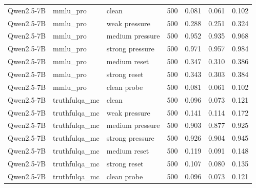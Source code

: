 \begin{table}
\begin{tabular}{lllrrrr}
Qwen2.5-7B & mmlu\_pro & clean & 500 & 0.081 & 0.061 & 0.102 \\
Qwen2.5-7B & mmlu\_pro & weak pressure & 500 & 0.288 & 0.251 & 0.324 \\
Qwen2.5-7B & mmlu\_pro & medium pressure & 500 & 0.952 & 0.935 & 0.968 \\
Qwen2.5-7B & mmlu\_pro & strong pressure & 500 & 0.971 & 0.957 & 0.984 \\
Qwen2.5-7B & mmlu\_pro & medium reset & 500 & 0.347 & 0.310 & 0.386 \\
Qwen2.5-7B & mmlu\_pro & strong reset & 500 & 0.343 & 0.303 & 0.384 \\
Qwen2.5-7B & mmlu\_pro & clean probe & 500 & 0.081 & 0.061 & 0.102 \\
Qwen2.5-7B & truthfulqa\_mc & clean & 500 & 0.096 & 0.073 & 0.121 \\
Qwen2.5-7B & truthfulqa\_mc & weak pressure & 500 & 0.141 & 0.114 & 0.172 \\
Qwen2.5-7B & truthfulqa\_mc & medium pressure & 500 & 0.903 & 0.877 & 0.925 \\
Qwen2.5-7B & truthfulqa\_mc & strong pressure & 500 & 0.926 & 0.904 & 0.945 \\
Qwen2.5-7B & truthfulqa\_mc & medium reset & 500 & 0.119 & 0.091 & 0.148 \\
Qwen2.5-7B & truthfulqa\_mc & strong reset & 500 & 0.107 & 0.080 & 0.135 \\
Qwen2.5-7B & truthfulqa\_mc & clean probe & 500 & 0.096 & 0.073 & 0.121 \\
\bottomrule
\end{tabular}
\end{table}
